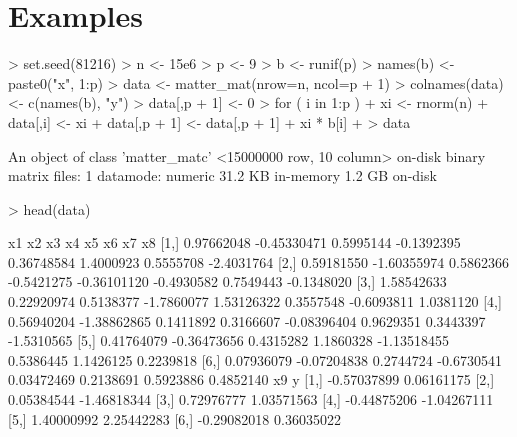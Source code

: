 \documentclass[a4paper]{article}
\begin{document}
\section{Examples}

\begin{Schunk}
\begin{Sinput}
> set.seed(81216)
> n <- 15e6
> p <- 9
> b <- runif(p)
> names(b) <- paste0("x", 1:p)
> data <- matter_mat(nrow=n, ncol=p + 1)
> colnames(data) <- c(names(b), "y")
> data[,p + 1] <- 0
> for ( i in 1:p ) {
+   xi <- rnorm(n)
+   data[,i] <- xi
+   data[,p + 1] <- data[,p + 1] + xi * b[i]
+ }
> data
\end{Sinput}
\begin{Soutput}
An object of class 'matter_matc'
  <15000000 row, 10 column> on-disk binary matrix
    files: 1
    datamode: numeric
    31.2 KB in-memory
    1.2 GB on-disk
\end{Soutput}
\begin{Sinput}
> head(data)
\end{Sinput}
\begin{Soutput}
             x1          x2        x3         x4          x5         x6         x7         x8
[1,] 0.97662048 -0.45330471 0.5995144 -0.1392395  0.36748584  1.4000923  0.5555708 -2.4031764
[2,] 0.59181550 -1.60355974 0.5862366 -0.5421275 -0.36101120 -0.4930582  0.7549443 -0.1348020
[3,] 1.58542633  0.22920974 0.5138377 -1.7860077  1.53126322  0.3557548 -0.6093811  1.0381120
[4,] 0.56940204 -1.38862865 0.1411892  0.3166607 -0.08396404  0.9629351  0.3443397 -1.5310565
[5,] 0.41764079 -0.36473656 0.4315282  1.1860328 -1.13518455  0.5386445  1.1426125  0.2239818
[6,] 0.07936079 -0.07204838 0.2744724 -0.6730541  0.03472469  0.2138691  0.5923886  0.4852140
              x9           y
[1,] -0.57037899  0.06161175
[2,]  0.05384544 -1.46818344
[3,]  0.72976777  1.03571563
[4,] -0.44875206 -1.04267111
[5,]  1.40000992  2.25442283
[6,] -0.29082018  0.36035022
\end{Soutput}
\end{Schunk}

\end{document}
